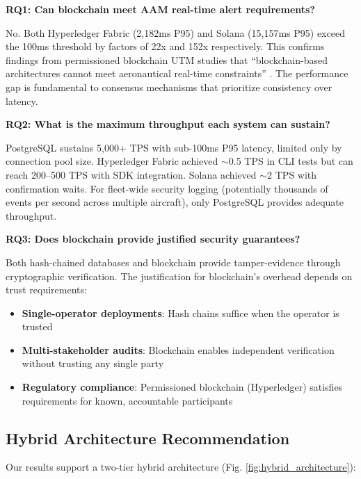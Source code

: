 \documentclass[conference]{IEEEtran}
\begin{document}
\textbf{RQ1: Can blockchain meet AAM real-time alert requirements?}

No. Both Hyperledger Fabric (2,182ms P95) and Solana (15,157ms P95) exceed the 100ms threshold by factors of 22x and 152x respectively. This confirms findings from permissioned blockchain UTM studies that ``blockchain-based architectures cannot meet aeronautical real-time constraints'' \cite{permissioned2024}. The performance gap is fundamental to consensus mechanisms that prioritize consistency over latency.

\textbf{RQ2: What is the maximum throughput each system can sustain?}

PostgreSQL sustains 5,000+ TPS with sub-100ms P95 latency, limited only by connection pool size. Hyperledger Fabric achieved $\sim$0.5 TPS in CLI tests but can reach 200--500 TPS with SDK integration. Solana achieved $\sim$2 TPS with confirmation waits. For fleet-wide security logging (potentially thousands of events per second across multiple aircraft), only PostgreSQL provides adequate throughput.

\textbf{RQ3: Does blockchain provide justified security guarantees?}

Both hash-chained databases and blockchain provide tamper-evidence through cryptographic verification. The justification for blockchain's overhead depends on trust requirements:

\begin{itemize}
\item \textbf{Single-operator deployments}: Hash chains suffice when the operator is trusted
\item \textbf{Multi-stakeholder audits}: Blockchain enables independent verification without trusting any single party
\item \textbf{Regulatory compliance}: Permissioned blockchain (Hyperledger) satisfies requirements for known, accountable participants
\end{itemize}

\subsection{Hybrid Architecture Recommendation}

Our results support a two-tier hybrid architecture (Fig. \ref{fig:hybrid_architecture}):
\end{document}
